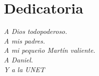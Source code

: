 \chapter*{Dedicatoria}

\begin{flushright}
\textit{A Dios todopoderoso.\\
A mis padres.\\
A mi pequeño Mart\'in valiente.\\
A Daniel.\\ 
Y a la UNET}
\end{flushright}